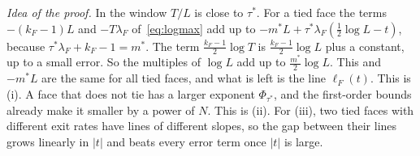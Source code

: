 \emph{Idea of the proof.} In the window $T/L$ is close to $\tau^*$. For a tied face the terms
$-(k_F-1)L$ and $-T\lambda_F$ of~\eqref{eq:logmax} add up to
$-m^*L+\tau^*\lambda_F(\frac12\log L-t)$, because $\tau^*\lambda_F+k_F-1=m^*$. The term
$\frac{k_F-1}2\log T$ is $\frac{k_F-1}2\log L$ plus a constant, up to a small error. So the
multiples of $\log L$ add up to $\frac{m^*}2\log L$. This and $-m^*L$ are the same for all tied
faces, and what is left is the line $\ell_F(t)$. This is (i). A face that does not tie has
a larger exponent $\Phi_{\tau^*}$, and the first-order bounds already make it smaller by a power of
$N$. This is (ii). For (iii), two tied faces with different exit rates have lines of different
slopes, so the gap between their lines grows linearly in $|t|$ and beats every error term once
$|t|$ is large.

